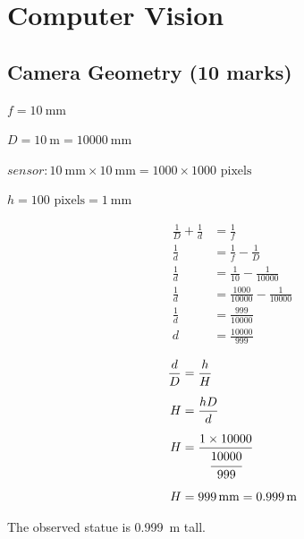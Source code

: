\section{Computer Vision}

\subsection{Camera Geometry (10 marks)}

$f = \SI{10}{\mm}$

$D = \SI{10}{\m} = \SI{10000}{\mm}$

$sensor: \SI{10}{\mm} \times \SI{10}{\mm} = 1000 \times 1000 \text{ pixels}$

$h = 100 \text{ pixels} = \SI{1}{\mm}$

\begin{multicols}{2}

\begin{align*}
    \frac{1}{D} + \frac{1}{d} &= \frac{1}{f} \\[1.25ex]
    \frac{1}{d} &= \frac{1}{f} - \frac{1}{D} \\[1.25ex]
    \frac{1}{d} &= \frac{1}{10} - \frac{1}{10000} \\[1.25ex]
    \frac{1}{d} &= \frac{1000}{10000} - \frac{1}{10000} \\[1.25ex]
    \frac{1}{d} &= \frac{999}{10000} \\[1.25ex]
    d &= \frac{10000}{999}
\end{align*}

\begin{align*}
    \frac{d}{D} &= \frac{h}{H} \\[1.25ex]
    H &= \frac{hD}{d} \\[1.25ex]
    H &= \frac{1 \times 10000}{\cfrac{10000}{999}} \\[1.25ex]
    H &= \SI{999}{\mm} = \SI{0.999}{\m}
\end{align*}

\end{multicols}

The observed statue is \SI{0.999}{\m} tall.

\bigskip

